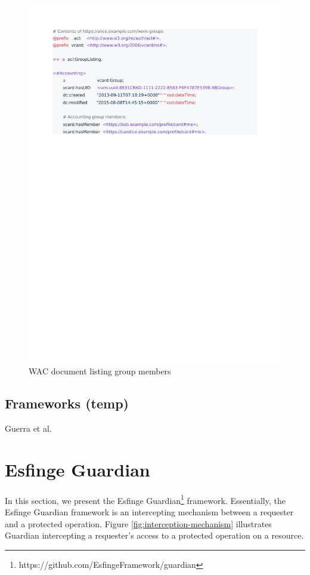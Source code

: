 \documentclass[sigconf]{acmart}
\begin{document}
\begin{figure}
  \includegraphics[trim=2cm 19cm 4.7cm 2cm, clip, scale=0.57]{pdf/work-groups}
  \caption{WAC document listing group members}
  \label{fig:group-listing}
\end{figure}


\subsection{Frameworks (temp)}
Guerra et al. \cite{Guerra2015}



\section{Esfinge Guardian}
In this section, we present the Esfinge Guardian\footnote{https://github.com/EsfingeFramework/guardian} framework. Essentially, the Esfinge Guardian framework is an intercepting mechanism between a requester and a protected operation. Figure \ref{fig:interception-mechanism} illustrates Guardian intercepting a requester's access to a protected operation on a resource.
\end{document}
